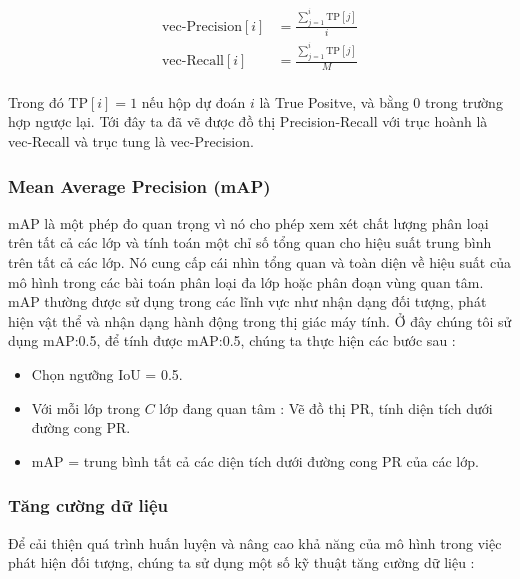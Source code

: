\documentclass[a4paper]{article}
\begin{document}
\begin{align*}
	\text{vec-Precision}[i] &= \frac{\sum_{j=1}^{i}{\text{TP}[j]}}{i} \\
	\text{vec-Recall}[i]    &= \frac{\sum_{j=1}^{i}{\text{TP}[j]}}{M} \\
\end{align*}

Trong đó TP$[i] = 1$ nếu hộp dự đoán $i$ là True Positve, và bằng $0$ trong trường hợp ngược lại.
Tới đây ta đã vẽ được đồ thị Precision-Recall với trục hoành là vec-Recall và trục tung là vec-Precision.

\subsubsection{Mean Average Precision (mAP)}

mAP là một phép đo quan trọng vì nó cho phép xem xét chất lượng phân loại trên tất cả các lớp và tính toán một chỉ số tổng quan cho hiệu suất trung bình trên tất cả các lớp. Nó cung cấp cái nhìn tổng quan và toàn diện về hiệu suất của mô hình trong các bài toán phân loại đa lớp hoặc phân đoạn vùng quan tâm. mAP thường được sử dụng trong các lĩnh vực như nhận dạng đối tượng, phát hiện vật thể và nhận dạng hành động trong thị giác máy tính. Ở đây chúng tôi sử dụng mAP:0.5, để tính được mAP:0.5, chúng ta thực hiện các bước sau :

\begin{itemize}
	\item Chọn ngưỡng IoU = 0.5.
	\item Với mỗi lớp trong $C$ lớp đang quan tâm : Vẽ đồ thị PR, tính diện tích dưới đường cong PR.
	\item mAP = trung bình tất cả các diện tích dưới đường cong PR của các lớp.
\end{itemize}

\subsubsection{\textbf{Tăng cường dữ liệu}}

Để cải thiện quá trình huấn luyện và nâng cao khả năng của mô hình trong việc phát hiện đối tượng, chúng ta sử dụng một số kỹ thuật tăng cường dữ liệu :
\end{document}
